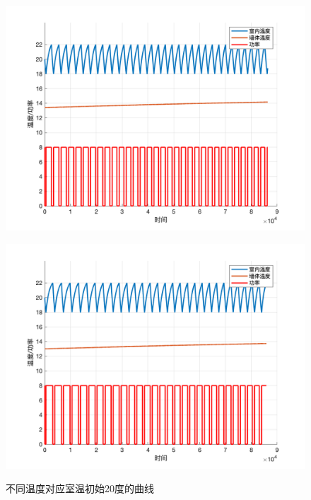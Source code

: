 \documentclass[withoutpreface,bwprint]{cumcmthesis} %
\begin{document}
\begin{figure}[H]
\begin{minipage}[c]{0.49\textwidth}
    \includegraphics[width=1\textwidth]{figures/1-20-15-20.png}
    \label{fig:my_label}
\end{minipage}
\begin{minipage}[c]{0.49\textwidth}
    \includegraphics[width=1\textwidth]{figures/1-20-15-25.png}
    \label{fig:my_label}
\end{minipage}
    \caption{不同温度对应室温初始20度的曲线}
\end{figure}
\end{document}
